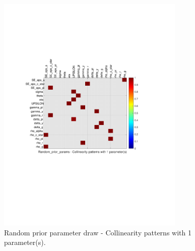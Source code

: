 
\begin{figure}[H]
\centering 
\includegraphics[width=0.8\textwidth]{fiscal/identification/fiscal_ident_collinearity_Random_prior_params_1}
\caption{Random prior parameter draw  - Collinearity patterns with 1 parameter(s).}\label{Fig:collinearity:Random_prior_params:1_pars}
\end{figure}


